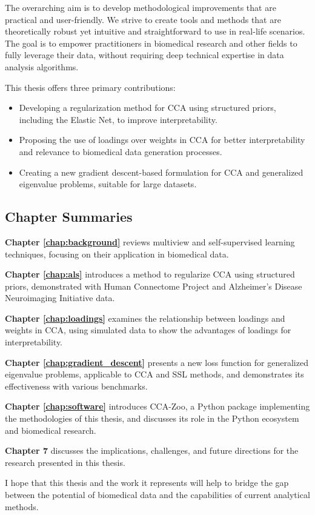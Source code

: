 The overarching aim is to develop methodological improvements that are practical and user-friendly. We strive to create tools and methods that are theoretically robust yet intuitive and straightforward to use in real-life scenarios. The goal is to empower practitioners in biomedical research and other fields to fully leverage their data, without requiring deep technical expertise in data analysis algorithms.

This thesis offers three primary contributions:

\begin{itemize}
    \item Developing a regularization method for CCA using structured priors, including the Elastic Net, to improve interpretability.
    \item Proposing the use of loadings over weights in CCA for better interpretability and relevance to biomedical data generation processes.
    \item Creating a new gradient descent-based formulation for CCA and generalized eigenvalue problems, suitable for large datasets.
\end{itemize}

\subsection{Chapter Summaries}

\textbf{Chapter \ref{chap:background}} reviews multiview and self-supervised learning techniques, focusing on their application in biomedical data.

\textbf{Chapter \ref{chap:als}} introduces a method to regularize CCA using structured priors, demonstrated with Human Connectome Project and Alzheimer's Disease Neuroimaging Initiative data.

\textbf{Chapter \ref{chap:loadings}} examines the relationship between loadings and weights in CCA, using simulated data to show the advantages of loadings for interpretability.

\textbf{Chapter \ref{chap:gradient_descent}} presents a new loss function for generalized eigenvalue problems, applicable to CCA and SSL methods, and demonstrates its effectiveness with various benchmarks.

\textbf{Chapter \ref{chap:software}} introduces CCA-Zoo, a Python package implementing the methodologies of this thesis, and discusses its role in the Python ecosystem and biomedical research.

\textbf{Chapter 7} discusses the implications, challenges, and future directions for the research presented in this thesis.

I hope that this thesis and the work it represents will help to bridge the gap between the potential of biomedical data and the capabilities of current analytical methods.
